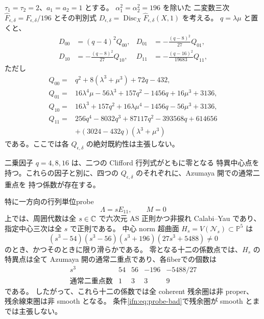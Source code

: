\begin{theorem}[対称係数の四判別式と一変数probeの十二特異値]
\label{ifn:thm:symmetric-probe}
$\tau_1=\tau_2=2$、$a_1=a_2=1$ とする。
$\alpha_1^2=\alpha_2^2=196$ を除いた
二変数三次 $\widehat F_{\epsilon,\delta}=F_{\epsilon,\delta}/196$ とその判別式
$D_{\epsilon,\delta}=\operatorname{Disc}_X\widehat F_{\epsilon,\delta}(X,1)$ を考える。
$q=\lambda\mu$ と置くと、
\begin{equation}\label{ifn:eq:symmetric-discriminants}
\begin{aligned}
 D_{00}&=(q-4)^2Q_{00},&
 D_{01}&=-\frac{(q-8)^2}{27}Q_{01},\\
 D_{10}&=-\frac{(q-8)^2}{27}Q_{10},&
 D_{11}&=-\frac{(q-16)^2}{19683}Q_{11},
\end{aligned}
\end{equation}
ただし
\begin{equation}\label{ifn:eq:symmetric-residuals}
\begin{aligned}
 Q_{00}={}&q^2+8(\lambda^3+\mu^3)+72q-432,\\
 Q_{01}={}&16\lambda^4\mu-56\lambda^3+157q^2-1456q
                   +16\mu^3+3136,\\
 Q_{10}={}&16\lambda^3+157q^2+16\lambda\mu^4
                   -1456q-56\mu^3+3136,\\
 Q_{11}={}&256q^4-8032q^3+87117q^2-393568q+614656\\
          &+(3024-432q)(\lambda^3+\mu^3)
\end{aligned}
\end{equation}
である。ここでは各 $Q_{\epsilon,\delta}$ の絶対既約性は主張しない。

二乗因子 $q=4,8,16$ は、二つの Clifford 行列式がともに零となる
特異中心点を持つ。これらの因子と別に、四つの
$Q_{\epsilon,\delta}$ のそれぞれに、Azumaya 開での通常二重点を
持つ係数が存在する。

特に一方向の行列単位probe
\begin{equation}\label{ifn:eq:probe-line}
                 \Lambda=sE_{11},\qquad M=0
\end{equation}
上では、周囲代数は全 $s\in\mathbb C$ で六次元 AS 正則かつ非捩れ
Calabi--Yau であり、指定中心三次は全 $s$ で正則である。
中心 norm 超曲面 $H_s=V(\mathcal N_s)\subset\mathbb P^5$ は
\begin{equation}\label{ifn:eq:probe-bad}
 (s^3-54)(s^3-56)(s^3+196)(27s^3+5488)\ne0
\end{equation}
のとき、かつそのときに限り滑らかである。
零となる十二の係数点では、$H_s$ の特異点は全て
Azumaya 開の通常二重点であり、各fiberでの個数は
\begin{equation}\label{ifn:eq:probe-node-counts}
\begin{array}{c|cccc}
 s^3&54&56&-196&-5488/27\\\hline
 \text{通常二重点数}&1&3&3&9
\end{array}
\end{equation}
である。
したがって、これら十二の係数では全 coherent 残余圏は非 proper、
残余線束圏は非 smooth となる。
条件\eqref{ifn:eq:probe-bad}で残余圏が smooth とまでは主張しない。
\end{theorem}

